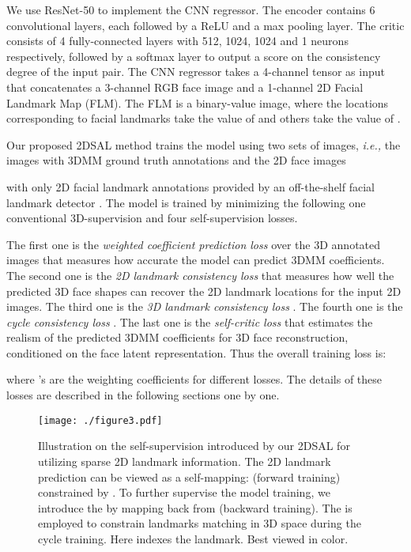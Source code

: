\documentclass[10pt,twocolumn,letterpaper]{article}
\begin{document}
We use ResNet-50 \cite{he2016deep} to implement the CNN regressor. The encoder contains 6 convolutional layers, each followed by a ReLU and a max pooling layer. The critic consists of 4 fully-connected layers with 512, 1024, 1024 and 1 neurons respectively, followed by a softmax layer to output a score on the consistency degree of the input pair. The CNN regressor takes  a 4-channel tensor as input that  concatenates a 3-channel RGB face image and a 1-channel 2D Facial Landmark Map (FLM). The FLM is a binary-value image, where the locations corresponding to  facial landmarks take the value of   and  others take the value of .

Our proposed 2DSAL method trains the model using two sets of images,  \textit{i.e.,} the images with 3DMM ground truth annotations and the 2D face images {with only 2D facial landmark annotations provided  by an off-the-shelf  facial landmark detector \cite{bulat2017far}. The model is trained by minimizing the following one conventional 3D-supervision and four self-supervision   losses.

The first one is the \emph{weighted coefficient prediction loss}  over the 3D annotated images that measures how accurate the model can predict 3DMM coefficients. The second one is the \emph{2D landmark consistency loss}  that measures how well the predicted 3D face shapes  can recover the  2D landmark locations for the input 2D images. The third one is the \textit{3D landmark consistency loss} . The fourth one is the \emph{cycle consistency loss} . {The last one is the \textit{self-critic loss}   that estimates the realism of the predicted 3DMM coefficients for 3D face reconstruction, conditioned on the face latent representation.}
Thus the  overall training loss is:

where 's are the weighting coefficients for different losses. The details of these losses are described in the following sections one by one. 

\begin{figure}[t]
    \hspace{0.9cm}
    \texttt{[image: ./figure3.pdf]}\vspace{-0.2cm}
   \caption{{{Illustration on the self-supervision introduced by our 2DSAL for utilizing sparse 2D landmark information. The 2D landmark prediction can be viewed as a self-mapping:  (forward training) constrained by . To further supervise the model training, we introduce the  by mapping back from  (backward training). The  is employed to constrain landmarks matching in 3D space during the cycle training. Here  indexes the landmark. Best viewed in color.}}}
\label{fig:3}
\end{figure}
}
\end{document}
